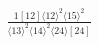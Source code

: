 \documentclass[varwidth, border=5pt]{standalone}
\begin{document}
\begin{my}
$\begin{gathered}
\scriptscriptstyle\frac{1[12]⟨12⟩^2⟨15⟩^2}{⟨13⟩^2⟨14⟩^2⟨24⟩[24]}
\end{gathered}$
\end{my}
\end{document}
